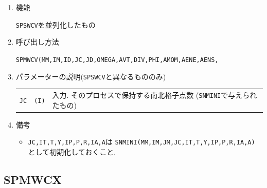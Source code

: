 \begin{enumerate}

\item 機能

{\tt SPSWCV}を並列化したもの

\item 呼び出し方法

{\tt SPMWCV(MM,IM,ID,JC,JD,OMEGA,AVT,DIV,PHI,AMOM,AENE,AENS,}\\
\hspace*{10em}{\tt RN,IT,T,Y,IP,P,R,IA,A,Q,WS,WW)}
  
\item パラメーターの説明({\tt SPSWCV}と異なるもののみ)

\begin{tabular}{lll}
{\tt JC} & {\tt (I)} & 入力. そのプロセスで保持する南北格子点数
                        ({\tt SNMINI}で与えられたもの)\\
\end{tabular}

\item 備考

\begin{itemize}

\item {\tt JC,IT,T,Y,IP,P,R,IA,A}は 
      {\tt SNMINI(MM,IM,JM,JC,IT,T,Y,IP,P,R,IA,A)} として初期化しておくこと.\\

 \end{itemize}

\end{enumerate}


\subsection{SPMWCX}

